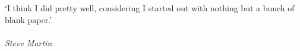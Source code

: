 \clearpage

\narrowlinespacing

\vspace*{4mm}

`I think I did pretty well, considering I started out with nothing but a bunch of blank paper.'\\
\\
\emph{Steve Martin}

\normallinespacing